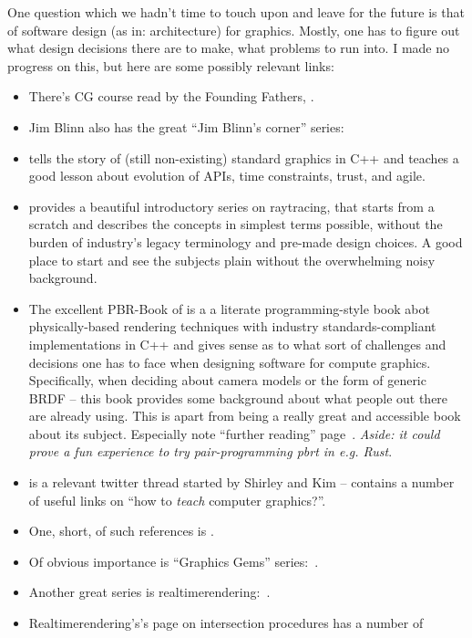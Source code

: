 One question which we hadn't time to touch upon and leave for the future is
that of software design (as in: architecture) for graphics.
Mostly, one has to figure out what design decisions there are to make,
what problems to run into. I made no progress on this, but here are some
possibly relevant links:
\begin{itemize}
\item There's CG course read by the Founding Fathers, \citet{blinnCatmullCG}.
\item Jim Blinn also has the great ``Jim Blinn's corner'' series:
\citet{jimTripPipeline,jimDirtyPixels,jimDirtyPixels}
\item \citet{sg13ApiFailed} tells the story of (still non-existing) standard
graphics in C++ and teaches a good lesson about evolution of APIs, time
constraints, trust, and agile.
\item \citet{shirleyRTWeekend} provides a beautiful introductory series on
raytracing, that starts from a scratch and describes the concepts in simplest
terms possible, without the burden of industry's legacy terminology and
pre-made design choices. A good place to start and see the subjects plain
without the overwhelming noisy background.
\item The excellent PBR-Book of \citet{pbrBook} is a a literate
programming-style book abot physically-based rendering techniques with industry
standards-compliant implementations in C++ and gives sense as to what sort of
challenges and decisions one has to face when designing software for compute
graphics. Specifically, when deciding about camera models or the form of
generic BRDF -- this book provides some background about what people out there
are already using. This is apart from being a really great and accessible book
about its subject. Especially note ``further reading'' page~\cite{pbrBookReading}.
\emph{Aside: it could prove a fun experience to try pair-programming pbrt in
e.g. Rust}.
\item \cite{shirleyKimTeaching} is a relevant twitter thread started by Shirley
and Kim -- contains a number of useful links on ``how to \emph{teach} computer
graphics?''.
\item One, short, of such references is \citet{texnh}.
\item Of obvious importance is ``Graphics Gems'' series:~\citet{graphicsGems}.
\item Another great series is realtimerendering:~\citet{RTR4}.
\item Realtimerendering's's page on intersection procedures has a number of

\end{itemize}
